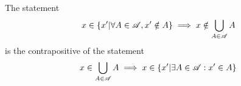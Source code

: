 \documentclass[main.tex]{subfiles}
\begin{document}
\subproblem{}\label{6a}

\begin{remark}
	The statement
	\[x \in \{x'|\forall A \in \mathscr{A}, x' \notin A\} \implies x \notin \bigcup\limits_{A \in \mathscr{A}} {A}\]
	is the contrapositive of the statement
	\[x \in \bigcup\limits_{A \in \mathscr{A}} {A} \implies x \in \{x'|\exists A \in \mathscr{A} : x' \in A\}\]
\end{remark}
\end{document}
